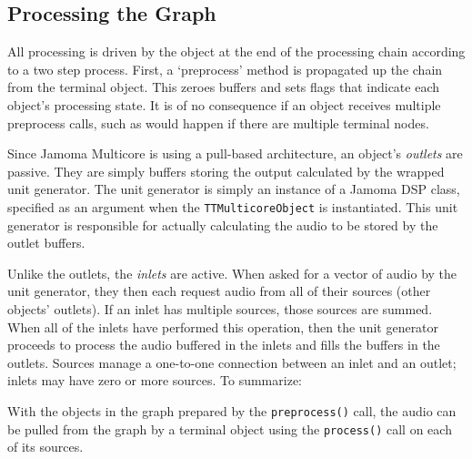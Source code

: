 \documentclass[twoside,a4paper]{article}
\begin{document}


\subsection{Processing the Graph} %

All processing is driven by the object at the end of the processing chain according to a two step process.  First, a `preprocess' method is propagated up the chain from the terminal object.  This zeroes buffers and sets flags that indicate each object's processing state.  It is of no consequence if an object receives multiple preprocess calls, such as would happen if there are multiple terminal nodes.

Since Jamoma Multicore is using a pull-based architecture, an object's \emph{outlets} are passive.  They are simply buffers storing the output calculated by the wrapped unit generator.  The unit generator is simply an instance of a Jamoma DSP class, specified as an argument when the \texttt{TTMulticoreObject} is instantiated.  This unit generator is responsible for actually calculating the audio to be stored by the outlet buffers.

Unlike the outlets, the \emph{inlets} are active.  When asked for a vector of audio by the unit generator, they then each request audio from all of their sources (other objects' outlets).  If an inlet has multiple sources, those sources are summed.  When all of the inlets have performed this operation, then the unit generator proceeds to process the audio buffered in the inlets and fills the buffers in the outlets.  Sources manage a one-to-one connection between an inlet and an outlet; inlets may have zero or more sources.  To summarize:

With the objects in the graph prepared by the \texttt{preprocess()} call, the audio can be pulled from the graph by a terminal object using the \texttt{process()} call on each of its sources.


\end{document}
